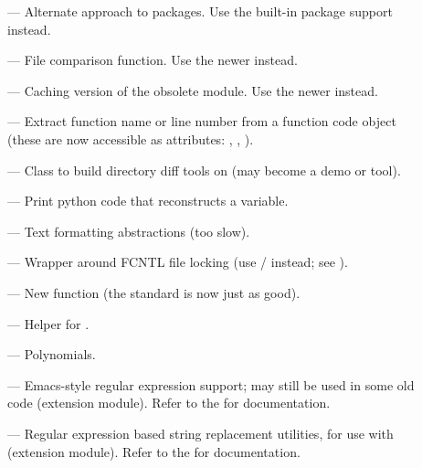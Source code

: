 \begin{description}
\item[]
--- Alternate approach to packages.  Use the built-in package support
instead.

\item[]
--- File comparison function.  Use the newer  instead.

\item[]
--- Caching version of the obsolete  module.  Use the
newer  instead.

\item[]
--- Extract function name or line number from a function
code object (these are now accessible as attributes:
, ,
).

\item[]
--- Class to build directory diff tools on (may become a demo or tool).

\item[]
--- Print python code that reconstructs a variable.

\item[]
--- Text formatting abstractions (too slow).

\item[]
--- Wrapper around FCNTL file locking (use
/ instead; see ).

\item[]
--- New  function (the standard  is
now just as good).

\item[]
--- Helper for .

\item[]
--- Polynomials.

\item[]
--- Emacs-style regular expression support; may still be used in some
old code (extension module).  Refer to the
 for documentation.

\item[]
--- Regular expression based string replacement utilities, for use
with  (extension module).  Refer to the
 for documentation.


\end{description}
